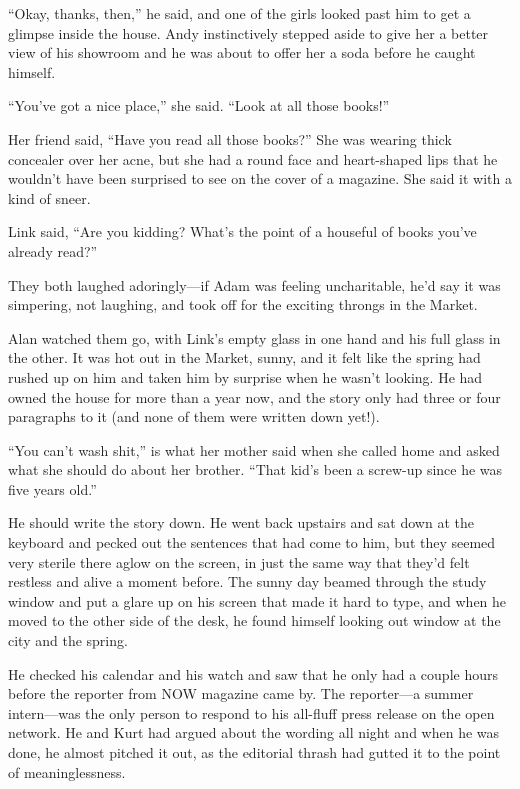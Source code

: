 ``Okay, thanks, then,'' he said, and one of the girls looked past him
to get a glimpse inside the house.  Andy instinctively stepped aside
to give her a better view of his showroom and he was about to offer
her a soda before he caught himself.

``You've got a nice place,'' she said.  ``Look at all those books!''

Her friend said, ``Have you read all those books?'' She was wearing
thick concealer over her acne, but she had a round face and
heart-shaped lips that he wouldn't have been surprised to see on the
cover of a magazine.  She said it with a kind of sneer.

Link said, ``Are you kidding?  What's the point of a houseful of books
you've already read?''

They both laughed adoringly---if Adam was feeling uncharitable, he'd
say it was simpering, not laughing, and took off for the exciting
throngs in the Market.

Alan watched them go, with Link's empty glass in one hand and his full
glass in the other.  It was hot out in the Market, sunny, and it felt
like the spring had rushed up on him and taken him by surprise when he
wasn't looking.  He had owned the house for more than a year now, and
the story only had three or four paragraphs to it (and none of them
were written down yet!).

``You can't wash shit,'' is what her mother said when she called home
and asked what she should do about her brother.  ``That kid's been a
screw-up since he was five years old.''

He should write the story down.  He went back upstairs and sat down at
the keyboard and pecked out the sentences that had come to him, but
they seemed very sterile there aglow on the screen, in just the same
way that they'd felt restless and alive a moment before.  The sunny
day beamed through the study window and put a glare up on his screen
that made it hard to type, and when he moved to the other side of the
desk, he found himself looking out window at the city and the spring.

He checked his calendar and his watch and saw that he only had a
couple hours before the reporter from NOW magazine came by.  The
reporter---a summer intern---was the only person to respond to his
all-fluff press release on the open network.  He and Kurt had argued
about the wording all night and when he was done, he almost pitched it
out, as the editorial thrash had gutted it to the point of
meaninglessness.

